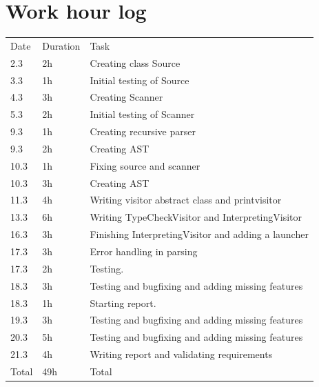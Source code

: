 \documentclass[12pt,a4paper]{article}
\begin{document}
\section{Work hour log}
\begin{center}
  \begin{tabular}{l l l}
    \bottomrule
    Date & Duration & Task \\
    2.3 & 2h & Creating class Source \\
    \bottomrule
    3.3 & 1h & Initial testing of Source \\
    \bottomrule
    4.3 & 3h & Creating Scanner \\
    \bottomrule
    5.3 & 2h & Initial testing of Scanner \\
    \bottomrule
    9.3 & 1h & Creating recursive parser \\
    \bottomrule
    9.3 & 2h & Creating AST \\
    \bottomrule
    10.3 & 1h & Fixing source and scanner \\
    \bottomrule
    10.3 & 3h & Creating AST \\
    \bottomrule
    11.3 & 4h & Writing visitor abstract class and printvisitor \\
    \bottomrule
    13.3 & 6h & Writing TypeCheckVisitor and InterpretingVisitor \\
    \bottomrule
    16.3 & 3h & Finishing InterpretingVisitor and adding a launcher \\
    \bottomrule
    17.3 & 3h & Error handling in parsing \\
    \bottomrule
    17.3 & 2h & Testing. \\
    \bottomrule
    18.3 & 3h & Testing and bugfixing and adding missing features \\
    \bottomrule
    18.3 & 1h & Starting report. \\
    \bottomrule
    19.3 & 3h & Testing and bugfixing and adding missing features \\
    \bottomrule
    20.3 & 5h & Testing and bugfixing and adding missing features \\
    \bottomrule
    21.3 & 4h & Writing report and validating requirements \\
    Total & 49h & Total \\
  \end{tabular}

\end{center}
\end{document}
